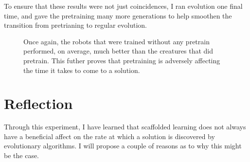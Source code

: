 \documentclass[12pt, a4paper]{article}
\begin{document}
To ensure that these results were not just coincidences, I ran evolution one final time, and gave the pretraining many more generations to help smoothen the transition from pretrianing to regular evolution.

\begin{figure}[ht]
\centering
{}	
\quad
{}
\caption{Once again, the robots that were trained without any pretrain performed, on average, much better than the creatures that did pretrain. This futher proves that pretraining is adversely affecting the time it takes to come to a solution.}
\end{figure}

\newpage

\section{Reflection}
Through this experiment, I have learned that scaffolded learning does not always have a beneficial affect on the rate at which a solution is discovered by evolutionary algorithms. I will propose a couple of reasons as to why this might be the case.
\end{document}
